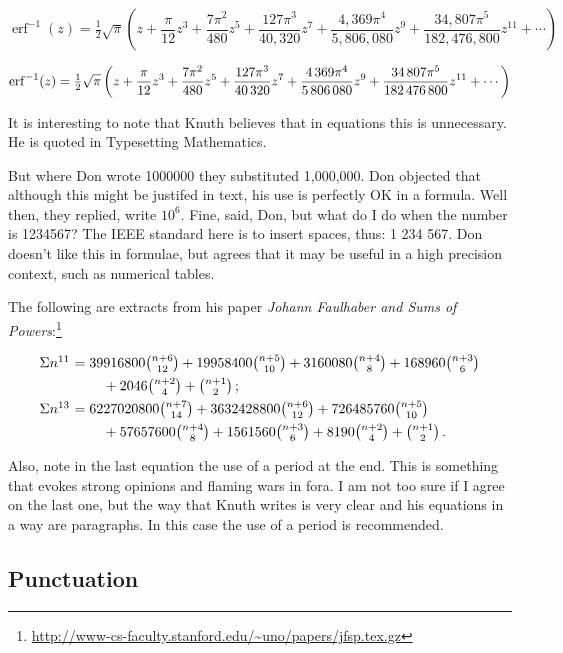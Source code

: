 {\[
\operatorname{erf}^{-1}(z)=\tfrac{1}{2}\sqrt{\pi}\left (z+\frac{\pi}{12}z^3+\frac{7\pi^2}{480}z^5+\frac{127\pi^3}{40{,}320}z^7+\frac{4{,}369\pi^4}{5{,}806{,}080}z^9+\frac{34{,}807\pi^5}{182{,}476,800}z^{11}+\cdots\right )
\]



\[
\operatorname{erf}^{-1}(z)=\tfrac{1}{2}\sqrt{\pi}\left (z+\frac{\pi}{12}z^3+\frac{7\pi^2}{480}z^5+\frac{127\pi^3}{40\thinspace 320}z^7+\frac{4\thinspace 369\pi^4}{5\thinspace 806\thinspace 080}z^9+\frac{34\thinspace 807\pi^5}{182\thinspace 476\thinspace 800}z^{11}+\cdots\right )
\]


It is interesting to note that Knuth believes that in equations this is unnecessary.
He is quoted in Typesetting Mathematics.


\begin{latexquotation}
But where Don wrote 1000000 they substituted
1,000,000. Don objected that although this might be justifed in text, his use is perfectly OK in a formula. Well then, they replied, write \(10^6\).
Fine, said, Don, but what do I do 
when the number is 1234567? The IEEE standard here is to insert spaces, thus: 1 234 567.
Don doesn't like this in formulae, but agrees that it may be useful in a high precision context, such as numerical tables. 
\end{latexquotation}



The following are extracts from his paper \textit{Johann Faulhaber and Sums of Powers}:\footnote{\url{http://www-cs-faculty.stanford.edu/~uno/papers/jfsp.tex.gz}}

{
\[\vcenter{\halign{$#$\hfil\ &$#$\hfil\cr
\Sigma n^{11}&=39916800{n+6\choose 12}+
19958400{n+5\choose 10}+3160080{n+4\choose 8}
+168960{n+3\choose 6}\cr
\noalign{\smallskip}
&\qquad\null+2046{n+2\choose 4}+{n+1\choose 2}\,;\cr
\noalign{\smallskip}
\Sigma n^{13}&=6227020800{n+7\choose 14}+3632428800{n+6\choose 12}+
726485760{n+5\choose 10}\cr
\noalign{\smallskip}
&\qquad\null+57657600{n+4\choose 8}
+1561560{n+3\choose 6}+8190{n+2\choose 4}+{n+1\choose 2}\,.\cr}}\]
}

Also, note in the last equation the use of a period at the end. 
This is something that evokes strong opinions and flaming wars in fora. 
I am not too sure if I agree on the last one, but the way that Knuth writes is very clear and his equations in a way are paragraphs. In this case the use of a period is recommended.


\subsection{Punctuation}

}
